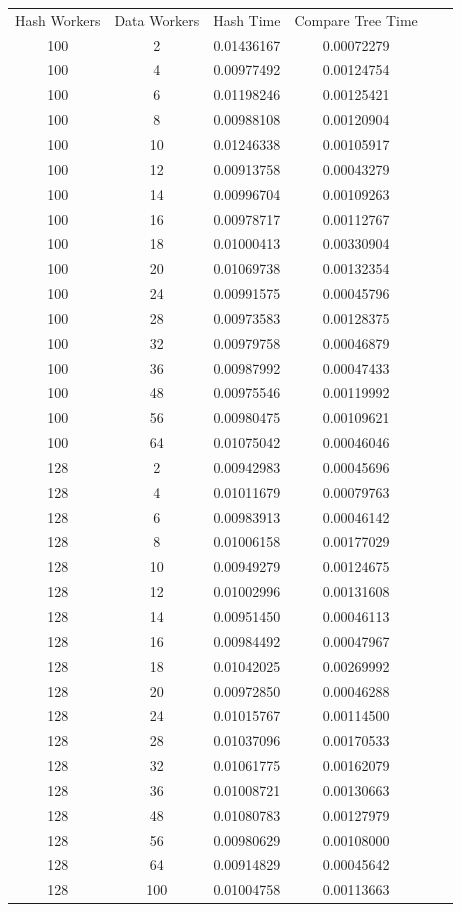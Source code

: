 \documentclass[letterpaper,12pt]{article}
\theoremstyle{remark}
\begin{document}
\begin{tabular}{cccccc}

Hash Workers & Data Workers & Hash Time & Compare Tree Time \\

100 & 2 & 0.01436167 & 0.00072279 \\
100 & 4 & 0.00977492 & 0.00124754 \\
100 & 6 & 0.01198246 & 0.00125421 \\
100 & 8 & 0.00988108 & 0.00120904 \\
100 & 10 & 0.01246338 & 0.00105917 \\
100 & 12 & 0.00913758 & 0.00043279 \\
100 & 14 & 0.00996704 & 0.00109263 \\
100 & 16 & 0.00978717 & 0.00112767 \\
100 & 18 & 0.01000413 & 0.00330904 \\
100 & 20 & 0.01069738 & 0.00132354 \\
100 & 24 & 0.00991575 & 0.00045796 \\
100 & 28 & 0.00973583 & 0.00128375 \\
100 & 32 & 0.00979758 & 0.00046879 \\
100 & 36 & 0.00987992 & 0.00047433 \\
100 & 48 & 0.00975546 & 0.00119992 \\
100 & 56 & 0.00980475 & 0.00109621 \\
100 & 64 & 0.01075042 & 0.00046046 \\
128 & 2 & 0.00942983 & 0.00045696 \\
128 & 4 & 0.01011679 & 0.00079763 \\
128 & 6 & 0.00983913 & 0.00046142 \\
128 & 8 & 0.01006158 & 0.00177029 \\
128 & 10 & 0.00949279 & 0.00124675 \\
128 & 12 & 0.01002996 & 0.00131608 \\
128 & 14 & 0.00951450 & 0.00046113 \\
128 & 16 & 0.00984492 & 0.00047967 \\
128 & 18 & 0.01042025 & 0.00269992 \\
128 & 20 & 0.00972850 & 0.00046288 \\
128 & 24 & 0.01015767 & 0.00114500 \\
128 & 28 & 0.01037096 & 0.00170533 \\
128 & 32 & 0.01061775 & 0.00162079 \\
128 & 36 & 0.01008721 & 0.00130663 \\
128 & 48 & 0.01080783 & 0.00127979 \\
128 & 56 & 0.00980629 & 0.00108000 \\
128 & 64 & 0.00914829 & 0.00045642 \\
128 & 100 & 0.01004758 & 0.00113663 \\

\end{tabular}
\end{document}
